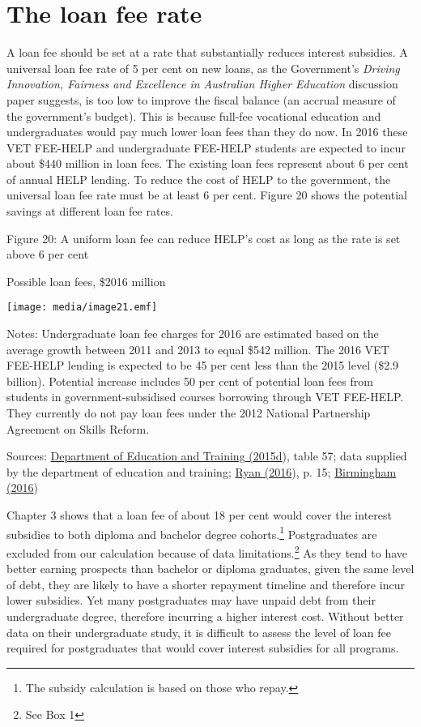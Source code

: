\documentclass[]{book}
\begin{document}
\section{The loan fee rate}\label{the-loan-fee-rate}

A loan fee should be set at a rate that substantially reduces interest subsidies. A universal loan fee rate of 5 per cent on new loans, as the Government's \emph{Driving Innovation, Fairness and Excellence in Australian Higher Education} discussion paper suggests, is too low to improve the fiscal balance (an accrual measure of the government's budget). This is because full-fee vocational education and undergraduates would pay much lower loan fees than they do now. In 2016 these VET FEE-HELP and undergraduate FEE-HELP students are expected to incur about \$440 million in loan fees. The existing loan fees represent about 6 per cent of annual HELP lending. To reduce the cost of HELP to the government, the universal loan fee rate must be at least 6 per cent. Figure 20 shows the potential savings at different loan fee rates.

\protect\hypertarget{_Ref333594109}{}{\protect\hypertarget{_Ref333594106}{}{}}Figure 20: A uniform loan fee can reduce HELP's cost as long as the rate is set above 6 per cent

Possible loan fees, \$2016 million

\texttt{[image: media/image21.emf]}

Notes: Undergraduate loan fee charges for 2016 are estimated based on the average growth between 2011 and 2013 to equal \$542 million. The 2016 VET FEE-HELP lending is expected to be 45 per cent less than the 2015 level (\$2.9 billion). Potential increase includes 50 per cent of potential loan fees from students in government-subsidised courses borrowing through VET FEE-HELP. They currently do not pay loan fees under the 2012 National Partnership Agreement on Skills Reform.

Sources: \protect\hyperlink{_ENREF_27}{Department of Education and Training (2015d}), table 57; data supplied by the department of education and training; \protect\hyperlink{_ENREF_71}{Ryan (2016}), p. 15; \protect\hyperlink{_ENREF_12}{Birmingham (2016})

Chapter 3 shows that a loan fee of about 18 per cent would cover the interest subsidies to both diploma and bachelor degree cohorts.\footnote{The subsidy calculation is based on those who repay.} Postgraduates are excluded from our calculation because of data limitations.\footnote{See Box 1} As they tend to have better earning prospects than bachelor or diploma graduates, given the same level of debt, they are likely to have a shorter repayment timeline and therefore incur lower subsidies. Yet many postgraduates may have unpaid debt from their undergraduate degree, therefore incurring a higher interest cost. Without better data on their undergraduate study, it is difficult to assess the level of loan fee required for postgraduates that would cover interest subsidies for all programs.
\end{document}
